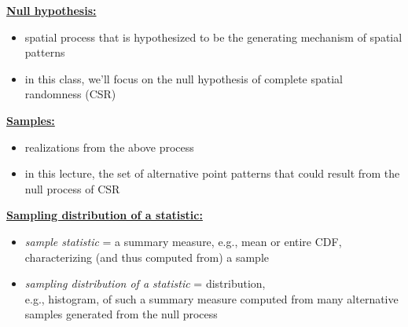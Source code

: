 \documentclass[portrait]{seminar}
\begin{document}
%
%
\begin{slide*}
\begin{center}
 \vspace*{-0.5cm} 
\end{center}
 \vspace{0.4cm}

\underline{\textbf{Null hypothesis:}}
\begin{itemize}
\item spatial process that is hypothesized to be the generating
mechanism of spatial patterns
\item in this class, we'll focus on the null hypothesis of complete
spatial randomness (CSR)
\end{itemize}

\vspace{0.3cm} \underline{\textbf{Samples:}}
\begin{itemize}
\item realizations from the above process
\item in this lecture, the set of alternative point patterns
that could result from the null process of CSR
\end{itemize}

\vspace{0.3cm} \underline{\textbf{Sampling distribution of a
statistic:}}
\begin{itemize}
\item \emph{sample statistic} = a summary measure, e.g., mean or
entire CDF, characterizing (and thus computed from) a sample
\item \emph{sampling distribution of a statistic} =
distribution, \\ e.g., histogram, of such a summary measure computed
from many alternative samples generated from the null process
\end{itemize}


\end{slide*}
\end{document}
